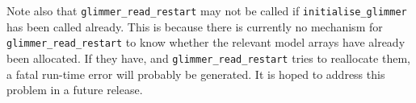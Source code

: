 Note also that \texttt{glimmer\_read\_restart} may not be called if
\texttt{initialise\_glimmer} has been called already. This is because there is
currently no mechanism for \texttt{glimmer\_read\_restart} to know whether the
relevant model arrays have already been allocated. If they have, and
\texttt{glimmer\_read\_restart} tries to reallocate them, a fatal
run-time error will probably be generated. It is hoped to address this problem
in a future release.
%